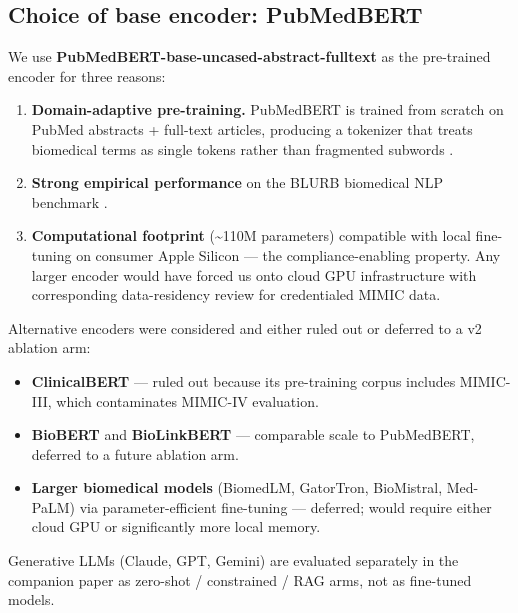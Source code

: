 \subsection{Choice of base encoder: PubMedBERT}\label{choice-of-base-encoder-pubmedbert}

We use \textbf{PubMedBERT-base-uncased-abstract-fulltext} \autocite{Gu2021} as
the pre-trained encoder for three reasons:

\begin{enumerate}
\def\labelenumi{(\alph{enumi})}
\item
  \textbf{Domain-adaptive pre-training.} PubMedBERT is trained from
  scratch on PubMed abstracts + full-text articles, producing a
  tokenizer that treats biomedical terms as single tokens rather than
  fragmented subwords \autocite{Devlin2019,Gururangan2020}.
\item
  \textbf{Strong empirical performance} on the BLURB biomedical NLP
  benchmark \autocite{Gu2021}.
\item
  \textbf{Computational footprint} (\textasciitilde110M parameters) compatible with
  local fine-tuning on consumer Apple Silicon --- the
  compliance-enabling property. Any larger encoder would have forced
  us onto cloud GPU infrastructure with corresponding data-residency
  review for credentialed MIMIC data.
\end{enumerate}

Alternative encoders were considered and either ruled out or
deferred to a v2 ablation arm:

\begin{itemize}
\tightlist
\item
  \textbf{ClinicalBERT} \autocite{Alsentzer2019} --- ruled out because its
  pre-training corpus includes MIMIC-III, which contaminates
  MIMIC-IV evaluation.
\item
  \textbf{BioBERT} \autocite{Lee2020} and \textbf{BioLinkBERT} \autocite{Yasunaga2022} ---
  comparable scale to PubMedBERT, deferred to a future ablation
  arm.
\item
  \textbf{Larger biomedical models} (BiomedLM, GatorTron, BioMistral,
  Med-PaLM) via parameter-efficient fine-tuning \autocite{Hu2022,Dettmers2023} --- deferred; would require either cloud GPU or
  significantly more local memory.
\end{itemize}

Generative LLMs (Claude, GPT, Gemini) are evaluated separately in
the companion paper \autocite{FungPhantomCodes2026} as zero-shot /
constrained / RAG arms, not as fine-tuned models.
